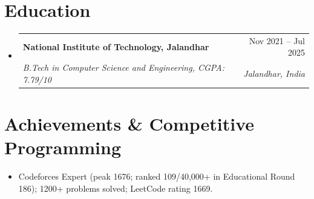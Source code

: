 \documentclass[letterpaper,10pt]{article}
\makeatletter
\newcommand{\resumeItem}[1]{
    \item\small{#1 \vspace{-2pt}}
}
\newcommand{\resumeSubheading}[4]{
    \vspace{-2pt}\item
    \begin{tabular*}{0.97\textwidth}[t]
        {l@{\extracolsep{\fill}}r}
        \textbf{#1} & #2 \\
        \textit{\small #3} & \textit{\small #4} \\
    \end{tabular*}
    \vspace{-7pt}
}
\makeatother
\begin{document}
\section{Education}
\begin{itemize}[label={},leftmargin=0pt]
  \resumeSubheading
    {National Institute of Technology, Jalandhar}{Nov 2021 -- Jul 2025}
    {B.Tech in Computer Science and Engineering, CGPA: 7.79/10}{Jalandhar, India}
\end{itemize}

\section{Achievements \& Competitive Programming}
\begin{itemize}[leftmargin=14pt,itemsep=0.5pt,topsep=1pt]
    \resumeItem{Codeforces Expert (peak 1676; ranked 109/40,000+ in Educational Round 186); 1200+ problems solved; LeetCode rating 1669.}
\end{itemize}
\end{document}
